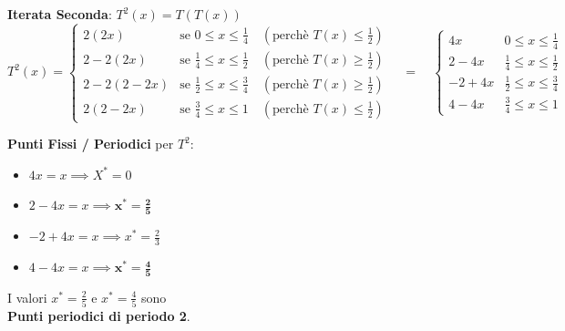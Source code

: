 \documentclass[openany]{book}
\theoremstyle{definition}
\theoremstyle{remark}
\begin{document}
\textbf{Iterata Seconda}: $T^2(x) = T(T(x))$
$$ T^2(x) = 
\begin{cases}
2(2x) & \text{se } 0 \le x \le \frac{1}{4} \quad (\text{perchè } T(x) \le \frac{1}{2}) \\
2 - 2(2x) & \text{se } \frac{1}{4} \le x \le \frac{1}{2} \quad (\text{perchè } T(x) \ge \frac{1}{2}) \\
2 - 2(2-2x) & \text{se } \frac{1}{2} \le x \le \frac{3}{4} \quad (\text{perchè } T(x) \ge \frac{1}{2}) \\
2(2-2x) & \text{se } \frac{3}{4} \le x \le 1 \quad (\text{perchè } T(x) \le \frac{1}{2})
\end{cases}
\quad = \quad
\begin{cases}
4x & 0 \leq x \leq \frac{1}{4} \\
2 - 4x & \frac{1}{4} \leq x \leq \frac{1}{2} \\
-2 + 4x & \frac{1}{2} \leq x \leq \frac{3}{4} \\
4 - 4x & \frac{3}{4} \leq x \leq 1
\end{cases} $$

\textbf{Punti Fissi / Periodici} per $T^2$:
\begin{minipage}{0.3\textwidth}
    \begin{center}
    \end{center}
\end{minipage}
\begin{minipage}{0.45\textwidth}
    \begin{itemize}
        \item $4x = x \implies X^* = 0$
        \item $2 - 4x = x \implies \mathbf{x^* = \frac{2}{5}}$
        \item $-2 + 4x = x \implies x^* = \frac{2}{3}$
        \item $4 - 4x = x \implies \mathbf{x^* = \frac{4}{5}}$
    \end{itemize}
    \vspace{0.5cm}
    I valori $x^* = \frac{2}{5}$ e $x^* = \frac{4}{5}$ sono \\  \textcolor{green!60!black}{\textbf{Punti periodici di periodo 2}}.
\end{minipage}
\end{document}
